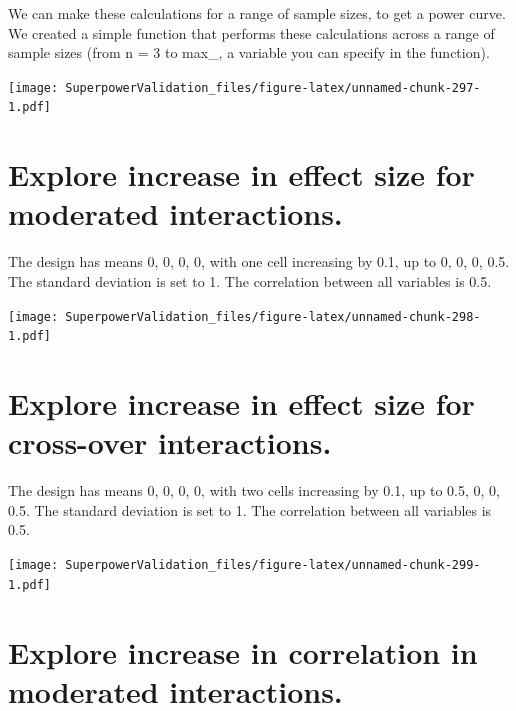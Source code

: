 \documentclass[]{book}
\newenvironment{Shaded}{\begin{snugshade}}{\end{snugshade}}
\newcommand{\DataTypeTok}[1]{\textcolor[rgb]{0.13,0.29,0.53}{#1}}
\newcommand{\DecValTok}[1]{\textcolor[rgb]{0.00,0.00,0.81}{#1}}
\newcommand{\KeywordTok}[1]{\textcolor[rgb]{0.13,0.29,0.53}{\textbf{#1}}}
\newcommand{\NormalTok}[1]{#1}
\newcommand{\OperatorTok}[1]{\textcolor[rgb]{0.81,0.36,0.00}{\textbf{#1}}}
\newcommand{\StringTok}[1]{\textcolor[rgb]{0.31,0.60,0.02}{#1}}
\begin{document}
We can make these calculations for a range of sample sizes, to get a power curve. We created a simple function that performs these calculations across a range of sample sizes (from n = 3 to max\_, a variable you can specify in the function).

\begin{Shaded}
\end{Shaded}

\texttt{[image: SuperpowerValidation\_files/figure-latex/unnamed-chunk-297-1.pdf]}

\hypertarget{explore-increase-in-effect-size-for-moderated-interactions.}{%
\section{Explore increase in effect size for moderated interactions.}\label{explore-increase-in-effect-size-for-moderated-interactions.}}

The design has means 0, 0, 0, 0, with one cell increasing by 0.1, up to 0, 0, 0, 0.5. The standard deviation is set to 1. The correlation between all variables is 0.5.

\texttt{[image: SuperpowerValidation\_files/figure-latex/unnamed-chunk-298-1.pdf]}

\hypertarget{explore-increase-in-effect-size-for-cross-over-interactions.}{%
\section{Explore increase in effect size for cross-over interactions.}\label{explore-increase-in-effect-size-for-cross-over-interactions.}}

The design has means 0, 0, 0, 0, with two cells increasing by 0.1, up to 0.5, 0, 0, 0.5. The standard deviation is set to 1. The correlation between all variables is 0.5.

\texttt{[image: SuperpowerValidation\_files/figure-latex/unnamed-chunk-299-1.pdf]}

\hypertarget{explore-increase-in-correlation-in-moderated-interactions.}{%
\section{Explore increase in correlation in moderated interactions.}\label{explore-increase-in-correlation-in-moderated-interactions.}}
\end{document}

